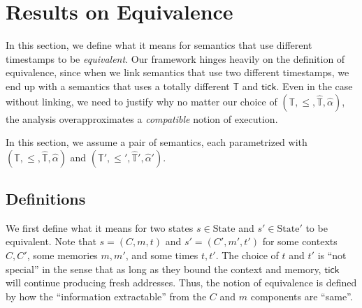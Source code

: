 \documentclass{article}
\theoremstyle{definition}
\newcommand*{\A}[1]{\widehat{#1}}
\newcommand*{\Time}{\mathbb{T}}
\newcommand*{\ATime}{\A{\Time}}
\newcommand*{\mem}{m}
\newcommand*{\State}{\text{State}}
\newcommand*{\tick}{\mathsf{tick}}
\begin{document}
\section{Results on Equivalence}
In this section, we define what it means for semantics that use different timestamps to be \emph{equivalent}.
Our framework hinges heavily on the definition of equivalence, since when we link semantics that use two different timestamps, we end up with a semantics that uses a totally different $\Time$ and $\tick$.
Even in the case without linking, we need to justify why no matter our choice of $(\Time,\le,\ATime,\A\alpha)$, the analysis overapproximates a \emph{compatible} notion of execution.

In this section, we assume a pair of semantics, each parametrized with $(\Time,\le,\ATime,\A\alpha)$ and $(\Time',\le',\ATime',\A\alpha')$.

\subsection{Definitions}
We first define what it means for two states $s\in\State$ and $s'\in\State'$ to be equivalent.
Note that $s=(C,\mem,t)$ and $s'=(C',\mem',t')$ for some contexts $C,C'$, some memories $\mem,\mem'$, and some times $t,t'$.
The choice of $t$ and $t'$ is ``not special'' in the sense that as long as they bound the context and memory, $\tick$ will continue producing fresh addresses.
Thus, the notion of equivalence is defined by how the ``information extractable'' from the $C$ and $\mem$ components are ``same''.
\end{document}
